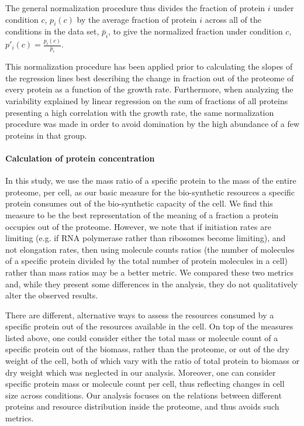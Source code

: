 \documentclass[10pt,letterpaper]{article}
\begin{document}
The general normalization procedure thus divides the fraction of protein $i$ under condition $c$, $p_i(c)$ by the average fraction of protein $i$ across all of the conditions in the data set, $\bar{p}_i$, to give the normalized fraction under condition $c$, $p'_i(c)=\frac{p_i(c)}{\bar{p}_i}$.

This normalization procedure has been applied prior to calculating the slopes of the regression lines best describing the change in fraction out of the proteome of every protein as a function of the growth rate.
Furthermore, when analyzing the variability explained by linear regression on the sum of fractions of all proteins presenting a high correlation with the growth rate, the same normalization procedure was made in order to avoid domination by the high abundance of a few proteins in that group.

\paragraph{Calculation of protein concentration}

In this study, we use the mass ratio of a specific protein to the mass of the entire proteome, per cell, as our basic measure for the bio-synthetic resources a specific protein consumes out of the bio-synthetic capacity of the cell.
We find this measure to be the best representation of the meaning of a fraction a protein occupies out of the proteome.
However, we note that if initiation rates are limiting (e.g. if RNA polymerase rather than ribosomes become limiting), and not elongation rates, then using molecule counts ratios (the number of molecules of a specific protein divided by the total number of protein molecules in a cell) rather than mass ratios may be a better metric.
We compared these two metrics and, while they present some differences in the analysis, they do not qualitatively alter the observed results.

There are different, alternative ways to assess the resources consumed by a specific protein out of the resources available in the cell.
On top of the measures listed above, one could consider either the total mass or molecule count of a specific protein out of the biomass, rather than the proteome, or out of the dry weight of the cell, both of which vary with the ratio of total protein to biomass or dry weight which was neglected in our analysis.
Moreover, one can consider specific protein mass or molecule count per cell, thus reflecting changes in cell size across conditions.
Our analysis focuses on the relations between different proteins and resource distribution inside the proteome, and thus avoids such metrics.
\end{document}
